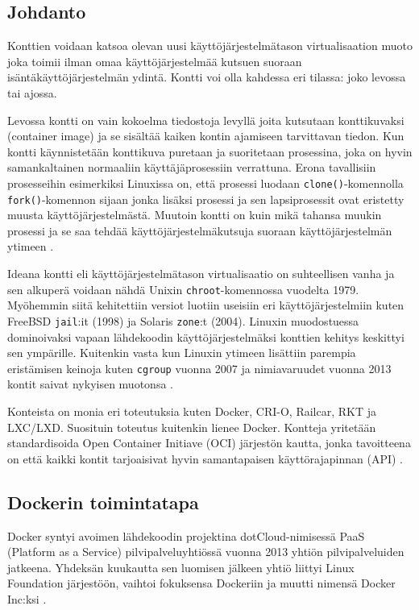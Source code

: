\documentclass[finnish,gradu]{tktltiki3}
\begin{document}
\subsection{Johdanto}

Konttien voidaan katsoa olevan uusi käyttöjärjestelmätason virtualisaation muoto joka toimii ilman omaa käyttöjärjestelmää kutsuen suoraan isäntäkäyttöjärjestelmän ydintä. Kontti voi olla kahdessa eri tilassa: joko levossa tai ajossa.

Levossa kontti on vain kokoelma tiedostoja levyllä joita kutsutaan konttikuvaksi (container image) ja se sisältää kaiken kontin ajamiseen tarvittavan tiedon. Kun kontti käynnistetään konttikuva puretaan ja suoritetaan prosessina, joka on hyvin samankaltainen normaaliin käyttäjäprosessiin verrattuna. Erona tavallisiin prosesseihin esimerkiksi Linuxissa on, että prosessi luodaan \texttt{clone()}-komennolla \texttt{fork()}-komennon sijaan jonka lisäksi prosessi ja sen lapsiprosessit ovat eristetty muusta käyttöjärjestelmästä. Muutoin kontti on kuin mikä tahansa muukin prosessi ja se saa tehdää käyttöjärjestelmäkutsuja suoraan käyttöjärjestelmän ytimeen \cite{docker}.

Ideana kontti eli käyttöjärjestelmätason virtualisaatio on suhteellisen vanha ja sen alkuperä voidaan nähdä Unixin \texttt{chroot}-komennossa vuodelta 1979. Myöhemmin siitä kehitettiin versiot luotiin useisiin eri käyttöjärjestelmiin kuten FreeBSD \texttt{jail}:it (1998) ja Solaris \texttt{zone}:t (2004). Linuxin muodostuessa dominoivaksi vapaan lähdekoodin käyttöjärjestelmäksi konttien kehitys keskittyi sen ympärille. Kuitenkin vasta kun Linuxin ytimeen lisättiin parempia eristämisen keinoja kuten \texttt{cgroup} vuonna 2007 ja nimiavaruudet vuonna 2013 kontit saivat nykyisen muotonsa \cite{lxc-docker-kubernetes}.

Konteista on monia eri toteutuksia kuten Docker, CRI-O, Railcar, RKT ja LXC/LXD. Suosituin toteutus kuitenkin lienee Docker. Kontteja yritetään standardisoida Open Container Initiave (OCI) järjestön kautta, jonka tavoitteena on että kaikki kontit tarjoaisivat hyvin samantapaisen käyttörajapinnan (API) \cite{practical-container}.

\subsection{Dockerin toimintatapa}

Docker syntyi avoimen lähdekoodin projektina dotCloud-nimisessä PaaS (Platform as a Service) pilvipalveluyhtiössä vuonna 2013 yhtiön pilvipalveluiden jatkeena. Yhdeksän kuukautta sen luomisen jälkeen yhtiö liittyi Linux Foundation järjestöön, vaihtoi fokuksensa Dockeriin ja muutti nimensä Docker Inc:ksi \cite{docker}.
\end{document}
